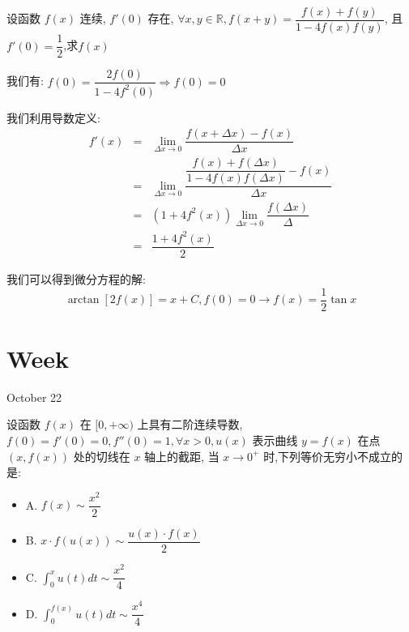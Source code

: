 \begin{example}[][Exam: 36.3.14]
	设函数 $f(x)$ 连续, $f'(0)$ 存在, $\forall x,y\in\mathbb{R}, f(x+y)=\dfrac{f(x)+f(y)}{1-4f(x)f(y)}$, 且 $f'(0)=\dfrac{1}{2}$,求$f(x)$
\end{example}

\begin{solution}

	我们有:  $f(0)=\dfrac{2f(0)}{1-4f^2(0)}\Rightarrow f(0)=0$
	
	我们利用导数定义:  
	\begin{eqnarray*}
		f'(x)&=&\lim\limits_{\Delta x\to 0}\dfrac{f(x+\Delta x)-f(x)}{\Delta x}\\
		&=&\lim\limits_{\Delta x\to 0}\dfrac{\dfrac{f(x)+f(\Delta x)}{1-4f(x)f(\Delta x)}-f(x)}{\Delta x}\\
		&=&(1+4f^{2}(x))\lim\limits_{\Delta x\to 0}\dfrac{f(\Delta x)}{\Delta}\\
		&=&\dfrac{1+4f^{2}(x)}{2}
	\end{eqnarray*}
	
	我们可以得到微分方程的解:  
	$$\arctan[2f(x)]=x+C,f(0)=0\to f(x)=\dfrac{1}{2}\tan x$$
\end{solution}


\section{Week }
\textcolor{purplea}{October 22}

\begin{example}[][Exam: 36.4.1]
	设函数 $f(x)$ 在 $[0,+\infty)$ 上具有二阶连续导数,
	$f(0)=f'(0)=0,f''(0)=1, \forall x>0, u(x)$ 表示曲线 $y=f(x)$ 在点 $(x,f(x))$ 处的切线在 $x$ 轴上的截距,
	当 $x\to 0^{+}$ 时,下列等价无穷小不成立的是:  
\begin{itemize}
	\item A. $f(x)\sim \dfrac{x^2}{2}$
	\item B. $x\cdot f(u(x))\sim \dfrac{u(x)\cdot f(x)}{2}$
	\item C. $\int_{0}^{x}u(t)dt\sim \dfrac{x^2}{4}$
	\item D. $\int_{0}^{f(x)}u(t)dt\sim \dfrac{x^4}{4}$
\end{itemize}
\end{example}

